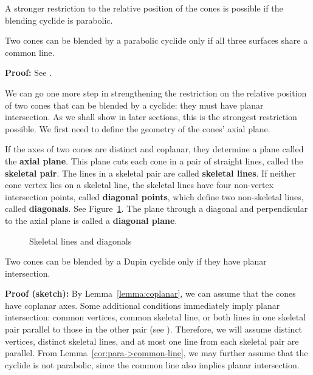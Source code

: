 A stronger restriction to the relative position of the cones
is possible if the blending cyclide is parabolic.

\begin{lemma}
\label{cor:para->common-line}
Two cones can be blended by a parabolic cyclide only if
all three surfaces share a common line.
\end{lemma}
{\bf Proof:} 
See \cite[Corollary~5.4]{shenethesis}.
\QED

We can go one more step in strengthening the restriction on the relative
position of two cones that can be blended by a cyclide: they must have
planar intersection.
As we shall show in later sections, this is the strongest restriction
possible.
We first need to define the geometry of the cones' axial plane.

\begin{definition}
If the axes of two cones are distinct and coplanar, they determine a plane
called the {\bf axial plane}.
This plane cuts each cone in a pair of straight lines, called the 
{\bf skeletal pair}.
The lines in a skeletal pair are called {\bf skeletal lines}.
If neither cone vertex lies on a skeletal line, the skeletal lines have
four non-vertex intersection points, called {\bf diagonal points},
which define two non-skeletal lines, called {\bf diagonals}.
See Figure~\ref{fig3.1}.
The plane through a diagonal and perpendicular to the axial plane is called a
{\bf diagonal plane}.
\end{definition}

\begin{figure}
\vspace{5cm}
\caption{Skeletal lines and diagonals}
\label{fig3.1}
\end{figure}

\begin{theorem}
Two cones can be blended by a Dupin cyclide only if they have 
planar intersection.
\end{theorem}
{\bf Proof (sketch):}
By Lemma~\ref{lemma:coplanar}, we can assume that the cones have coplanar axes.
Some additional conditions immediately imply planar intersection:
common vertices, common skeletal line,
or both lines in one skeletal pair parallel to those in the other pair
(see \cite[Section~5.6]{shenethesis}).
Therefore, we will assume distinct vertices, distinct skeletal lines, and
at most one line from each skeletal pair are parallel.
From Lemma~\ref{cor:para->common-line}, we may further assume that the cyclide
is not parabolic, since the common line also implies planar intersection.

